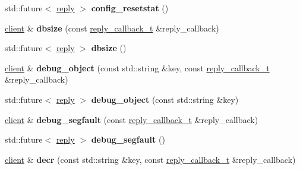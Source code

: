 \begin{DoxyCompactItemize}
std\+::future$<$ \hyperlink{classcpp__redis_1_1reply}{reply} $>$ {\bfseries config\+\_\+resetstat} ()
\item 
\mbox{\label{classcpp__redis_1_1client_a87a8351f0a6927db52b4ab2a5b9192c9}} 
\hyperlink{classcpp__redis_1_1client}{client} \& {\bfseries dbsize} (const \hyperlink{classcpp__redis_1_1client_a061a1140d36d2eaeda82b09a0bb3f9f2}{reply\+\_\+callback\+\_\+t} \&reply\+\_\+callback)
\item 
\mbox{\label{classcpp__redis_1_1client_aa9169c3c4a8b3ec5ee7b7bc601ae8a52}} 
std\+::future$<$ \hyperlink{classcpp__redis_1_1reply}{reply} $>$ {\bfseries dbsize} ()
\item 
\mbox{\label{classcpp__redis_1_1client_ad96e4d369e87e858fd7a8296b5cc378e}} 
\hyperlink{classcpp__redis_1_1client}{client} \& {\bfseries debug\+\_\+object} (const std\+::string \&key, const \hyperlink{classcpp__redis_1_1client_a061a1140d36d2eaeda82b09a0bb3f9f2}{reply\+\_\+callback\+\_\+t} \&reply\+\_\+callback)
\item 
\mbox{\label{classcpp__redis_1_1client_a9d7a2eae091f99db6b5479577de0bf99}} 
std\+::future$<$ \hyperlink{classcpp__redis_1_1reply}{reply} $>$ {\bfseries debug\+\_\+object} (const std\+::string \&key)
\item 
\mbox{\label{classcpp__redis_1_1client_ac5d06ca1072ef1a83a8843c448e4d1e3}} 
\hyperlink{classcpp__redis_1_1client}{client} \& {\bfseries debug\+\_\+segfault} (const \hyperlink{classcpp__redis_1_1client_a061a1140d36d2eaeda82b09a0bb3f9f2}{reply\+\_\+callback\+\_\+t} \&reply\+\_\+callback)
\item 
\mbox{\label{classcpp__redis_1_1client_a764786e7003c538a6cf0a5d6b44d66dd}} 
std\+::future$<$ \hyperlink{classcpp__redis_1_1reply}{reply} $>$ {\bfseries debug\+\_\+segfault} ()
\item 
\mbox{\label{classcpp__redis_1_1client_a8e09d5753d9f9ba00b1d5e8aed306189}} 
\hyperlink{classcpp__redis_1_1client}{client} \& {\bfseries decr} (const std\+::string \&key, const \hyperlink{classcpp__redis_1_1client_a061a1140d36d2eaeda82b09a0bb3f9f2}{reply\+\_\+callback\+\_\+t} \&reply\+\_\+callback)

\end{DoxyCompactItemize}
